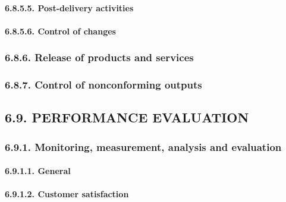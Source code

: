\documentclass[
]{article}
\begin{document}
\hypertarget{post-delivery-activities-1}{%
\paragraph{6.8.5.5. Post-delivery
activities}\label{post-delivery-activities-1}}

\hypertarget{control-of-changes-1}{%
\paragraph{6.8.5.6. Control of changes}\label{control-of-changes-1}}

\hypertarget{release-of-products-and-services-1}{%
\subsubsection{6.8.6. Release of products and
services}\label{release-of-products-and-services-1}}

\hypertarget{control-of-nonconforming-outputs-1}{%
\subsubsection{6.8.7. Control of nonconforming
outputs}\label{control-of-nonconforming-outputs-1}}

\hypertarget{performance-evaluation-1}{%
\subsection{6.9. PERFORMANCE
EVALUATION}\label{performance-evaluation-1}}

\hypertarget{monitoring-measurement-analysis-and-evaluation-1}{%
\subsubsection{6.9.1. Monitoring, measurement, analysis and
evaluation}\label{monitoring-measurement-analysis-and-evaluation-1}}

\hypertarget{general-15}{%
\paragraph{6.9.1.1. General}\label{general-15}}

\hypertarget{customer-satisfaction-1}{%
\paragraph{6.9.1.2. Customer
satisfaction}\label{customer-satisfaction-1}}
\end{document}
